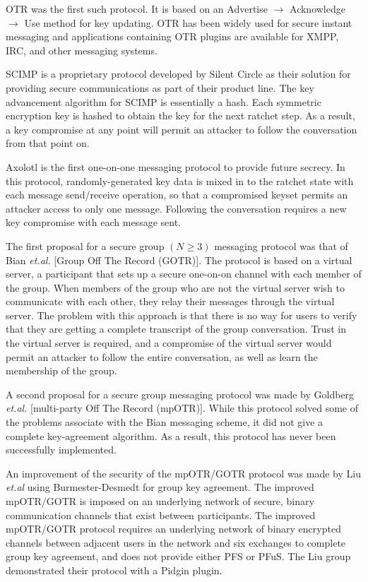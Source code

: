 \documentclass[%
preprint,
amsmath,amssymb,
aps,
prb,
floatfix,
]{revtex4-1}
\begin{document}
OTR was the first such protocol. It is based on an Advertise $\rightarrow$
Acknowledge $\rightarrow$ Use method for key updating. OTR has been widely used
for secure instant messaging and applications containing OTR plugins are
available for XMPP, IRC, and other messaging systems.

SCIMP is a proprietary protocol developed by Silent Circle as their solution for
providing secure communications as part of their product line. The key
advancement algorithm for SCIMP is essentially a hash. Each symmetric encryption
key is hashed to obtain the key for the next ratchet step. As a result, a key
compromise at any point will permit an attacker to follow the conversation from
that point on.

Axolotl is the first one-on-one messaging protocol to provide future secrecy. In
this protocol, randomly-generated key data is mixed in to the ratchet state with
each message send/receive operation, so that a compromised keyset permits an
attacker access to only one message. Following the conversation requires a new
key compromise with each message sent.

The first proposal for a secure group $(N \ge 3)$ messaging protocol was that of
Bian \textit{et.al.}\cite{ref:bian} [Group Off The Record (GOTR)].
The protocol is based on a virtual server,
a participant that sets up a secure one-on-on channel with each member of the group.
When members of the group who are not the virtual server wish to communicate
with each other, they relay their messages through the virtual server. The
problem with this approach is that there is no way for users to verify that they
are getting a complete transcript of the group conversation. Trust in the
virtual server is required, and a compromise of the virtual server would permit
an attacker to follow the entire conversation, as well as learn the membership
of the group.

A second proposal for a secure group messaging protocol was made by Goldberg
\textit{et.al.}\cite{ref:goldberg} [multi-party Off The Record (mpOTR)].
While this protocol solved some of the
problems associate with the Bian messaging scheme, it did not give a complete
key-agreement algorithm. As a result, this protocol has never been successfully
implemented.

An improvement of the security of the mpOTR/GOTR protocol was made by Liu
\textit{et.al}\cite{ref:liu} using Burmester-Desmedt\cite{ref:burmester}
for group key agreement. The improved mpOTR/GOTR is imposed on an
underlying network of secure, binary communication channels that exist between
participants.
The improved mpOTR/GOTR protocol requires an underlying network of binary
encrypted channels between adjacent users in the network and
six exchanges to complete group key agreement,
and does not provide either PFS or PFuS.
The Liu group demonstrated their protocol with a Pidgin\cite{ref:pidgin} plugin.
\end{document}
